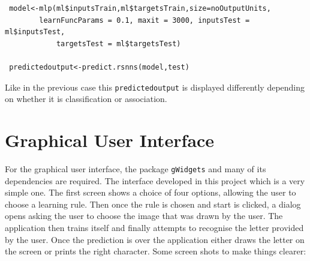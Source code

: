 \documentclass[a4paper,12pt]{report}
\begin{document}
\begin{verbatim}
 model<-mlp(ml$inputsTrain,ml$targetsTrain,size=noOutputUnits,
        learnFuncParams = 0.1, maxit = 3000, inputsTest = ml$inputsTest,
		    targetsTest = ml$targetsTest)
		    
 predictedoutput<-predict.rsnns(model,test)          
\end{verbatim}
Like in the previous case this \verb+predictedoutput+ is displayed differently depending on whether it is classification or
association.


\section*{Graphical User Interface}
For the graphical user interface, the package \verb+gWidgets+ and many of its dependencies are required. The interface developed
in this project which is a very simple one. The first screen shows a choice of four options, allowing the user to choose a learning rule.
Then once the rule is chosen and start is clicked, a dialog opens asking the user to choose the image that was drawn by the user.
The application then trains itself and finally attempts to recognise the letter provided by the user. Once the prediction is over
the application either draws the letter on the screen or prints the right character.
Some screen shots to make things clearer:
\end{document}
